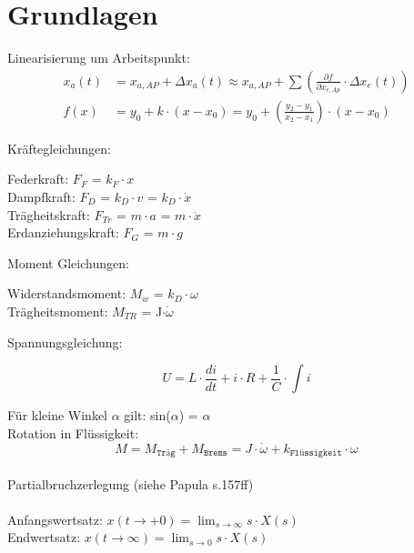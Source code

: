 \section{Grundlagen}
Linearisierung um Arbeitspunkt:
\begin{align*}
	x_{a}(t) &= x_{a,AP}+\Delta x_{a}(t) \approx x_{a,AP}+\sum\left(\frac{\partial f}{\partial x_{e,Ap}} \cdot \Delta x_{e}(t)\right)\\
	f(x) &= y_0 + k \cdot (x - x_0) = y_0 + \left(\frac{y_2 - y_1}{x_2 - x_1}\right) \cdot (x - x_0)
\end{align*}

Kräftegleichungen:
\begin{mdframed}[style=exercise]
	Federkraft: $F_F$ = $k_F \cdot x$\\
	Dampfkraft: $F_D$ = $k_D \cdot v$ = $k_D \cdot \dot{x}$\\
	Trägheitskraft: $F_{Tr}$ = $m\cdot a$ = $m\cdot \ddot{x}$\\
	Erdanziehungskraft: $F_G$ = $m\cdot g$
\end{mdframed}
Moment Gleichungen:
\begin{mdframed}[style=exercise]
	Widerstandsmoment: $M_w$ = $k_D \cdot \omega$\\
	Trägheitsmoment: $M_{TR}$ = J$\cdot \dot{\omega}$
\end{mdframed}
Spannungsgleichung:
\begin{mdframed}[style=exercise]
	\[
		U = L\cdot \frac{di}{dt}+i\cdot R+\frac{1}{C} \cdot \int i
	\]
\end{mdframed}
Für kleine Winkel $\alpha$ gilt: sin($\alpha$) = $\alpha$\\
Rotation in Flüssigkeit:
\[
	M=M_{\texttt{Träg}}+M_{\texttt{Brems}}=J \cdot \dot{\omega} +k_{\texttt{Flüssigkeit}} \cdot \omega
\]\\
Partialbruchzerlegung (siehe Papula s.157ff)\\
\\
Anfangswertsatz: $x(t \rightarrow +0)=\lim _{s \rightarrow \infty} s \cdot X(s)$\\
Endwertsatz: $x(t \rightarrow \infty)=\lim _{s \rightarrow 0} s \cdot X(s)$
